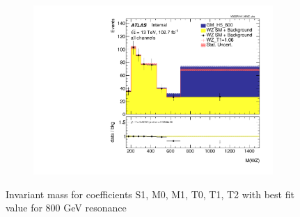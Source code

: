 \documentclass[../Bachelorarbeit.tex]{subfiles}
\begin{document}
\begin{figure}[h]
\begin{subfigure}{0.3\textwidth}
    \end{subfigure}
    \begin{subfigure}{0.3\textwidth}
        \includegraphics[width=\textwidth]{Plots/ALL_MWZ_final/GM_H5_800/T1/2022-05-07/VBSSR/all_VV_MWZ_vbs.pdf}
    \end{subfigure}

    \caption{Invariant mass for coefficients S1, M0, M1, T0, T1, T2 with best fit value for 800 GeV resonance}
    \label{fig:all_mwz_800}
\end{figure}
\end{document}
